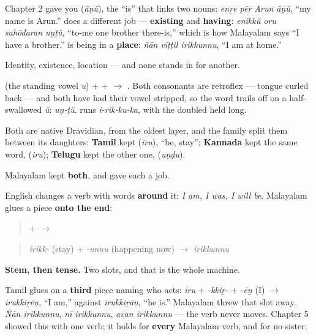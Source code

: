 Chapter 2 gave you \textbf{} (\emph{āṇŭ}), the \textquotedblleft{}is\textquotedblright{} that links two nouns: \emph{enṟe pēr Arun āṇŭ}, \textquotedblleft{}my name is Arun.\textquotedblright{} \textbf{} does a different job — \textbf{existing} and \textbf{having}: \emph{enikkŭ oru sahōdaran uṇṭŭ}, \textquotedblleft{}to-me one brother there-is,\textquotedblright{} which is how Malayalam says \textquotedblleft{}I have a brother.\textquotedblright{} \textbf{} is being in a \textbf{place}: \emph{ñān vīṭṭil irikkunnu}, \textquotedblleft{}I am at home.\textquotedblright{}

Identity, existence, location — and none stands in for another.

\begin{sounds}
\textbf{} (the standing vowel \emph{u}) + \textbf{} + \textbf{} $\to$ \textbf{}. Both consonants are retroflex — tongue curled back — and both have had their vowel stripped, so the word trails off on a half-swallowed \emph{ŭ}: \emph{uṇ-ṭŭ}. \textbf{} runs \emph{i-rik-ku-ka}, with the doubled \textbf{} held long.
\end{sounds}

\begin{cousinweb}
Both are native Dravidian, from the oldest layer, and the family split them between its daughters: \textbf{Tamil} kept \textbf{} (\emph{iru}), \textquotedblleft{}be, stay\textquotedblright{}; \textbf{Kannada} kept the same word, \textbf{} (\emph{iru}); \textbf{Telugu} kept the other one, \textbf{} (\emph{uṇḍu}).

Malayalam kept \textbf{both}, and gave each a job.
\end{cousinweb}

\begin{grammarlens}[title={Grammar Lens: two pieces, where Tamil has three}]
English changes a verb with words \textbf{around} it: \emph{I am, I was, I will be}. Malayalam glues a piece \textbf{onto the end}:

\begin{quote}
\textbf{} + \textbf{} $\to$ \textbf{}
\end{quote}

\begin{quote}
\emph{irikk-} (stay) + \emph{-unnu} (happening now) $\to$ \emph{irikkunnu}
\end{quote}

\textbf{Stem, then tense.} Two slots, and that is the whole machine.

Tamil glues on a \textbf{third} piece naming who acts: \emph{iru} + \emph{-kkiṟ-} + \emph{-ēṉ} (I) $\to$ \emph{irukkiṟēṉ}, \textquotedblleft{}I am,\textquotedblright{} against \emph{irukkiṟāṉ}, \textquotedblleft{}he is.\textquotedblright{} Malayalam threw that slot away. \emph{Ñān irikkunnu}, \emph{nī irikkunnu}, \emph{avan irikkunnu} — the verb never moves. Chapter 5 showed this with one verb; it holds for \textbf{every} Malayalam verb, and for no sister.
\end{grammarlens}

